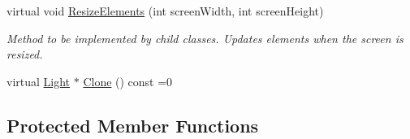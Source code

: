 \begin{DoxyCompactItemize}
virtual void \mbox{\hyperlink{class_geometry_engine_1_1_geometry_world_item_1_1_geometry_light_1_1_light_a18009ba6ef9c788f3d33d1ebd78a2140}{Resize\+Elements}} (int screen\+Width, int screen\+Height)
\begin{DoxyCompactList}\small\item\em Method to be implemented by child classes. Updates elements when the screen is resized. \end{DoxyCompactList}\item 
virtual \mbox{\hyperlink{class_geometry_engine_1_1_geometry_world_item_1_1_geometry_light_1_1_light}{Light}} $\ast$ \mbox{\hyperlink{class_geometry_engine_1_1_geometry_world_item_1_1_geometry_light_1_1_light_af367fa7201ad377a45fdc13e2002c518}{Clone}} () const =0
\end{DoxyCompactItemize}
\subsection*{Protected Member Functions}
